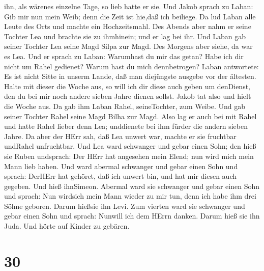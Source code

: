 ihn, als wärenes einzelne Tage, so lieb hatte er sie.  Und
Jakob sprach zu Laban: Gib mir nun mein Weib; denn die Zeit ist hie,daß
ich beiliege.  Da lud Laban alle Leute des Orts und machte
ein Hochzeitsmahl.  Des Abends aber nahm er seine Tochter
Lea und brachte sie zu ihmhinein; und er lag bei ihr.  Und
Laban gab seiner Tochter Lea seine Magd Silpa zur Magd. 
Des Morgens aber siehe, da war es Lea. Und er sprach zu Laban: Warumhast
du mir das getan? Habe ich dir nicht um Rahel gedienet? Warum hast du
mich dennbetrogen?  Laban antwortete: Es ist nicht Sitte in
unserm Lande, daß man diejüngste ausgebe vor der ältesten. 
Halte mit dieser die Woche aus, so will ich dir diese auch geben um
denDienst, den du bei mir noch andere sieben Jahre dienen sollst.
 Jakob tat also und hielt die Woche aus. Da gab ihm Laban
Rahel, seineTochter, zum Weibe.  Und gab seiner Tochter
Rahel seine Magd Bilha zur Magd.  Also lag er auch bei mit
Rahel und hatte Rahel lieber denn Lea; unddienete bei ihm fürder die
andern sieben Jahre.  Da aber der HErr sah, daß Lea unwert
war, machte er sie fruchtbar undRahel unfruchtbar.  Und Lea
ward schwanger und gebar einen Sohn; den hieß sie Ruben undsprach: Der
HErr hat angesehen mein Elend; nun wird mich mein Mann lieb haben.
 Und ward abermal schwanger und gebar einen Sohn und
sprach: DerHErr hat gehöret, daß ich unwert bin, und hat mir diesen auch
gegeben. Und hieß ihnSimeon.  Abermal ward sie schwanger
und gebar einen Sohn und sprach: Nun wirdsich mein Mann wieder zu mir
tun, denn ich habe ihm drei Söhne geboren. Darum hießsie ihn Levi.
 Zum vierten ward sie schwanger und gebar einen Sohn und
sprach: Nunwill ich dem HErrn danken. Darum hieß sie ihn Juda. Und hörte
auf Kinder zu gebären.

\hypertarget{section-29}{%
\section{30}\label{section-29}}

